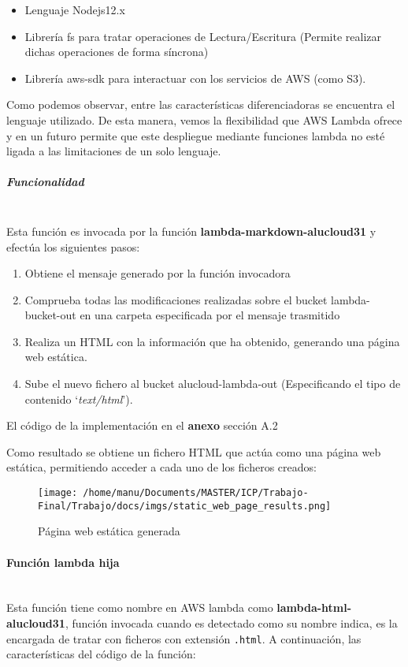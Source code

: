 \documentclass[
]{article}
\begin{document}
\begin{itemize}
\item
  Lenguaje Nodejs12.x
\item
  Librería fs para tratar operaciones de Lectura/Escritura (Permite
  realizar dichas operaciones de forma síncrona)
\item
  Librería aws-sdk para interactuar con los servicios de AWS (como S3).
\end{itemize}

Como podemos observar, entre las características diferenciadoras se
encuentra el lenguaje utilizado. De esta manera, vemos la flexibilidad
que AWS Lambda ofrece y en un futuro permite que este despliegue
mediante funciones lambda no esté ligada a las limitaciones de un solo
lenguaje.

\hypertarget{header-n77}{%
\subparagraph{Funcionalidad}\label{header-n77}}
\leavevmode
\newline
\\
Esta función es invocada por la función
\textbf{lambda-markdown-alucloud31} y efectúa los siguientes pasos:

\begin{enumerate}
\def\labelenumi{\arabic{enumi}.}
\item
  Obtiene el mensaje generado por la función invocadora
\item
  Comprueba todas las modificaciones realizadas sobre el bucket
  lambda-bucket-out en una carpeta especificada por el mensaje
  trasmitido
\item
  Realiza un HTML con la información que ha obtenido, generando una
  página web estática.
\item
  Sube el nuevo fichero al bucket alucloud-lambda-out (Especificando el
  tipo de contenido `\emph{text/html}').
\end{enumerate}

El código de la implementación en el \textbf{anexo} sección A.2

Como resultado se obtiene un fichero HTML que actúa como una página web
estática, permitiendo acceder a cada uno de los ficheros creados:

\begin{figure}[H]
\centering
\texttt{[image: /home/manu/Documents/MASTER/ICP/Trabajo-Final/Trabajo/docs/imgs/static\_web\_page\_results.png]}
\caption{Página web estática generada}
\end{figure}

\hypertarget{header-n92}{%
\paragraph{Función lambda hija}\label{header-n92}}
\leavevmode
\newline
\\
Esta función tiene como nombre en AWS lambda como
\textbf{lambda-html-alucloud31}, función invocada cuando es detectado
como su nombre indica, es la encargada de tratar con ficheros con
extensión \texttt{.html}. A continuación, las características del código
de la función:
\end{document}
